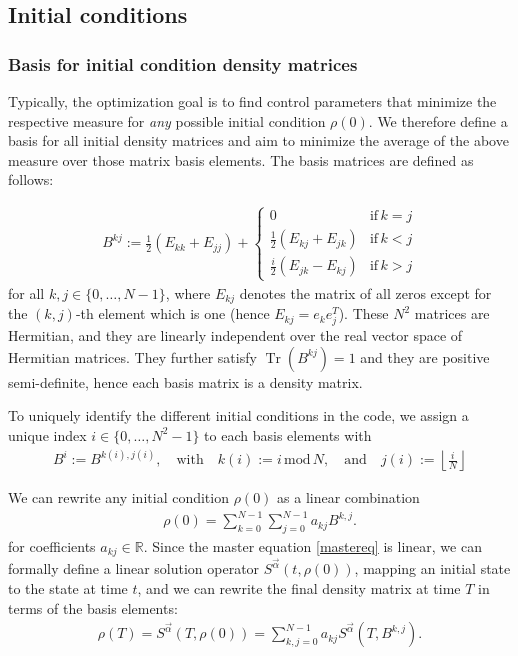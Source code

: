 \documentclass[letterpaper]{article}
\DeclareMathOperator{\Tr}{Tr}
\newcommand{\R}{\mathds{R}}
\begin{document}
\subsection{Initial conditions}\label{subsec:initcond}

\subsubsection{Basis for initial condition density matrices}
Typically, the optimization goal is to find control parameters that minimize the
respective measure for \textit{any} possible initial condition $\rho(0)$. We
therefore define a basis for all initial density matrices and aim to minimize
the average of the above measure over those matrix basis elements. The basis
matrices are defined as follows:

\begin{align}
B^{kj} := \frac 12 \left( E_{kk} + E_{jj}\right) +  \begin{cases} 
          0 & \text{if} \, k=j \\ 
        \frac 12 \left( E_{kj} + E_{jk}\right) & \text{if} \, k<j \\
        \frac i2 \left( E_{jk} - E_{kj}\right) & \text{if} \, k>j
      \end{cases} 
\end{align}
for all $k,j\in\{0,\dots, N-1\}$, where $E_{kj}$ denotes the matrix of all zeros
except for the $(k,j)$-th element which is one (hence $E_{kj} = e_ke_j^T$).
These $N^2$ matrices are Hermitian, and they are linearly independent over the
real vector space of Hermitian matrices. They further satisfy $\Tr(B^{kj}) = 1$
and they are positive semi-definite, hence each basis matrix is a density
matrix. 

To uniquely identify the different initial conditions in the code, we assign a
unique index $i \in \{0,\dots, N^2-1\}$ to each basis elements with 
\begin{align*}
  B^i := B^{k(i), j(i)}, \quad \text{with} \quad k(i) := i \,\mbox{mod}\, N,
  \quad \text{and} \quad j(i) := \left\lfloor \frac{i}{N} \right\rfloor
\end{align*}

We can rewrite any initial condition $\rho(0)$ as a linear combination 
\begin{align}
  \rho(0) = \sum_{k=0}^{N-1} \sum_{j=0}^{N-1} a_{kj} B^{k, j}.
\end{align}
for coefficients $a_{kj} \in \R$.
Since the master equation \eqref{mastereq} is linear, we can formally define a
linear solution operator $S^{\vec{\alpha}}(t,\rho(0))$, mapping an initial state
to the state at time $t$, and we can rewrite the final density matrix at time
$T$ in terms of the basis elements:
\begin{align}
  \rho(T) = S^{\vec{\alpha}}(T,\rho(0)) = \sum_{k,j=0}^{N-1} a_{kj}
  S^{\vec{\alpha}}(T,B^{k, j}).
\end{align}
\end{document}
